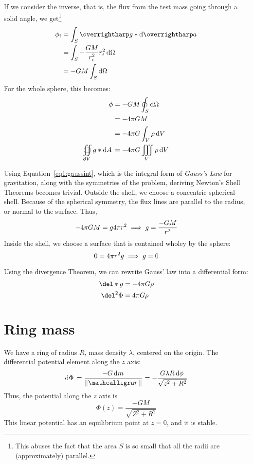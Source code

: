 If we consider the inverse, that is, the flux from the test mass going through a solid angle, we get\footnote{This abuses the fact that the area \(S\) is so small that all the radii are (approximately) parallel.}
\begin{align*}
	\phi_i&=\int_S\vv{g}*\d{\vv a}\\
	      &=\int_S -\frac{GM}{r_i^2} r_i^2\d{\Omega}\\
	      &=-GM\int_S\d{\Omega}\\
\end{align*}
For the whole sphere, this becomes:
\begin{subequations}
\begin{align}
	\phi&=-GM\oint_S\d\Omega\nonumber\\
	    &=-4\pi GM\nonumber\\
	    &=-4\pi G\int_V\rho\d{V}\label{eq1:gaussint}\\
	\oiint_{\partial V}g*\d{A}&=-4\pi G\iiint_V\rho\d{V}
\end{align}
\end{subequations}

Using Equation~\ref{eq1:gaussint}, which is the integral form of \emph{Gauss's Law} for gravitation, along with the symmetries of the problem, deriving Newton's Shell Theorems becomes trivial. Outside the shell, we choose a concentric spherical shell. Because of the spherical symmetry, the flux lines are parallel to the radius, or normal to the surface. Thus,
\[-4\pi GM = g 4\pi r^2\implies g=\frac{-GM}{r^2}\]
Inside the shell, we choose a surface that is contained wholey by the sphere:
\[0=4 \pi r^2 g\implies g=0\]

Using the divergence Theorem, we can rewrite Gauss' law into a differential form:
\begin{subequations}
\begin{align*}
	\del*g &= -4\pi G \rho\\
	\del^2\Phi &=4\pi G\rho
\end{align*}
\end{subequations}

\section{Ring mass}
We have a ring of radius \(R\), mass density \(\lambda\), centered on the origin. The differential potential element along the \(z\) axis:
\[\d\Phi = \frac{-G\d{m}}{\norm{\sr}} = -\frac{G\lambda R\d\phi}{\sqrt{z^2+R^2}}\]
Thus, the potential along the \(z\) axis is
\begin{equation}
	\Phi(z)=\frac{-GM}{\sqrt{Z^2+R^2}}
\end{equation}
This linear potential has an equilibrium point at \(z=0\), and it is stable.


